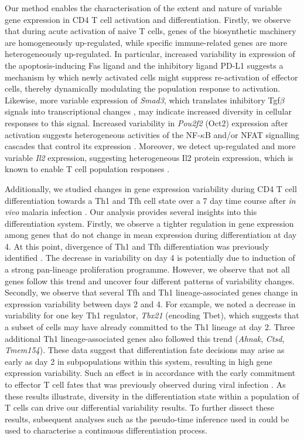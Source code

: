 Our method enables the characterisation of the extent and nature of variable gene expression in CD4\plus{} T cell activation and differentiation. 
Firstly, we observe that during acute activation of naive T cells, genes of the biosynthetic machinery are homogeneously up-regulated, while specific immune-related genes are more heterogeneously up-regulated. In particular, increased variability in expression of the apoptosis-inducing Fas ligand \citep{Strasser2009} and the inhibitory ligand PD-L1 \citep{Chikuma2016} suggests a mechanism by which newly activated cells might suppress re-activation of effector cells, thereby dynamically modulating the population response to activation. 
Likewise, more variable expression of \emph{Smad3}, which translates inhibitory \gls{Tgf}$\beta$ signals into transcriptional changes \citep{Delisle2013}, may indicate increased diversity in cellular responses to this signal. 
Increased variability in \textit{Pou2f2} (Oct2) expression after activation suggests heterogeneous activities of the NF-$\kappa$B and/or \gls{NFAT} signalling cascades that control its expression \citep{Mueller2013}.
Moreover, we detect up-regulated and more variable \textit{Il2} expression, suggesting heterogeneous Il2 protein expression, which is known to enable T cell population responses \citep{Fuhrmann2016}. 

Additionally, we studied changes in gene expression variability during CD4\plus{} T cell differentiation towards a Th1 and Tfh cell state over a 7 day time course after \textit{in vivo} malaria infection \citep{Lonnberg2017}. 
Our analysis provides several insights into this differentiation system. 
Firstly, we observe a tighter regulation in gene expression among genes that do not change in mean expression during differentiation at day 4. 
At this point, divergence of Th1 and Tfh differentiation was previously identified \citep{Lonnberg2017}. 
The decrease in variability on day 4 is potentially due to induction of a strong pan-lineage proliferation programme. 
However, we observe that not all genes follow this trend and uncover four different patterns of variability changes. 
Secondly, we observe that several Tfh and Th1 lineage-associated genes change in expression variability between days 2 and 4. For example, we noted a decrease in variability for one key Th1 regulator, \textit{Tbx21} (encoding Tbet), which suggests that a subset of cells may have already committed to the Th1 lineage at day 2. 
Three additional Th1 lineage-associated genes also followed this trend (\textit{Ahnak}, \textit{Ctsd}, \textit{Tmem154}). 
These data suggest that differentiation fate decisions may arise as early as day 2 in subpopulations within this system, resulting in high gene expression variability. 
Such an effect is in accordance with the early commitment to effector T cell fates that was previously observed during viral infection \citep{Choi2011}. 
As these results illustrate, diversity in the differentiation state within a population of T cells can drive our differential variability results. 
To further dissect these results, subsequent analyses such as the pseudo-time inference used in \cite{Lonnberg2017} could be used to characterise a continuous differentiation process.\\

